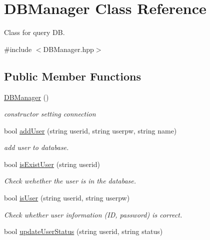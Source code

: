 \hypertarget{class_d_b_manager}{}\section{D\+B\+Manager Class Reference}
\label{class_d_b_manager}


Class for query DB.  




{\ttfamily \#include $<$D\+B\+Manager.\+hpp$>$}

\subsection*{Public Member Functions}
\begin{DoxyCompactItemize}
\item 
\mbox{\label{class_d_b_manager_afb4f09d26522754aab71b801716a8325}} 
\mbox{\hyperlink{class_d_b_manager_afb4f09d26522754aab71b801716a8325}{D\+B\+Manager}} ()
\begin{DoxyCompactList}\small\item\em constructor setting connection \end{DoxyCompactList}\item 
bool \mbox{\hyperlink{class_d_b_manager_a7ad381fbe40d8947790984f40e05a59a}{add\+User}} (string userid, string userpw, string name)
\begin{DoxyCompactList}\small\item\em add user to database. \end{DoxyCompactList}\item 
bool \mbox{\hyperlink{class_d_b_manager_ae4df9e089ce729370abd432af32ab0a5}{is\+Exist\+User}} (string userid)
\begin{DoxyCompactList}\small\item\em Check wehether the user is in the database. \end{DoxyCompactList}\item 
bool \mbox{\hyperlink{class_d_b_manager_a3fb201b447281395526cc71e8c408051}{is\+User}} (string userid, string userpw)
\begin{DoxyCompactList}\small\item\em Check whether user information (ID, password) is correct. \end{DoxyCompactList}\item 
bool \mbox{\hyperlink{class_d_b_manager_aa2a2c53b87cc1200416f6e825e524410}{update\+User\+Status}} (string userid, string status)

\end{DoxyCompactItemize}
